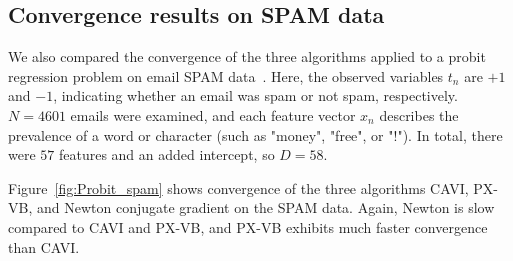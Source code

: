 \documentclass{article}
\begin{document}
\subsection{Convergence results on SPAM data}
We also compared the convergence of the three algorithms applied to a probit regression problem on email SPAM data~\cite{Efron}. Here, the observed variables $t_n$ are $+1$ and $-1$, indicating whether an email was spam or not spam, respectively. $N=4601$ emails were examined, and each feature vector $x_n$ describes the prevalence of a word or character (such as "money", "free", or "!"). In total, there were $57$ features and an added intercept, so $D = 58$. 

Figure~\ref{fig:Probit_spam} shows convergence of the three algorithms CAVI, PX-VB, and Newton conjugate gradient on the SPAM data.  Again, Newton is slow compared to CAVI and PX-VB, and PX-VB exhibits much faster convergence than CAVI. 
\end{document}
